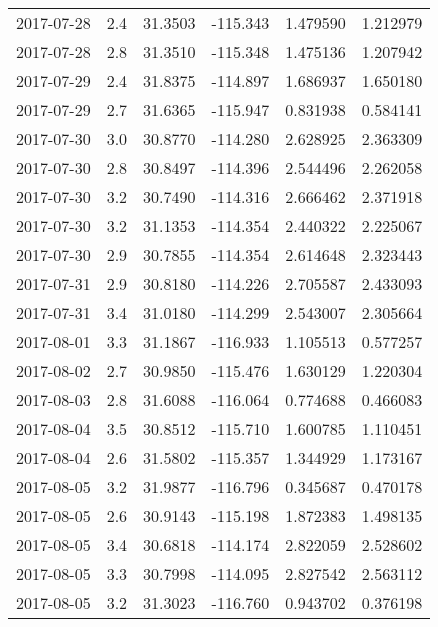 \begin{tabular}{lrrrrr}
2017-07-28 &       2.4 &  31.3503 &  -115.343 &         1.479590 &         1.212979 \\
2017-07-28 &       2.8 &  31.3510 &  -115.348 &         1.475136 &         1.207942 \\
2017-07-29 &       2.4 &  31.8375 &  -114.897 &         1.686937 &         1.650180 \\
2017-07-29 &       2.7 &  31.6365 &  -115.947 &         0.831938 &         0.584141 \\
2017-07-30 &       3.0 &  30.8770 &  -114.280 &         2.628925 &         2.363309 \\
2017-07-30 &       2.8 &  30.8497 &  -114.396 &         2.544496 &         2.262058 \\
2017-07-30 &       3.2 &  30.7490 &  -114.316 &         2.666462 &         2.371918 \\
2017-07-30 &       3.2 &  31.1353 &  -114.354 &         2.440322 &         2.225067 \\
2017-07-30 &       2.9 &  30.7855 &  -114.354 &         2.614648 &         2.323443 \\
2017-07-31 &       2.9 &  30.8180 &  -114.226 &         2.705587 &         2.433093 \\
2017-07-31 &       3.4 &  31.0180 &  -114.299 &         2.543007 &         2.305664 \\
2017-08-01 &       3.3 &  31.1867 &  -116.933 &         1.105513 &         0.577257 \\
2017-08-02 &       2.7 &  30.9850 &  -115.476 &         1.630129 &         1.220304 \\
2017-08-03 &       2.8 &  31.6088 &  -116.064 &         0.774688 &         0.466083 \\
2017-08-04 &       3.5 &  30.8512 &  -115.710 &         1.600785 &         1.110451 \\
2017-08-04 &       2.6 &  31.5802 &  -115.357 &         1.344929 &         1.173167 \\
2017-08-05 &       3.2 &  31.9877 &  -116.796 &         0.345687 &         0.470178 \\
2017-08-05 &       2.6 &  30.9143 &  -115.198 &         1.872383 &         1.498135 \\
2017-08-05 &       3.4 &  30.6818 &  -114.174 &         2.822059 &         2.528602 \\
2017-08-05 &       3.3 &  30.7998 &  -114.095 &         2.827542 &         2.563112 \\
2017-08-05 &       3.2 &  31.3023 &  -116.760 &         0.943702 &         0.376198 \\

\end{tabular}
